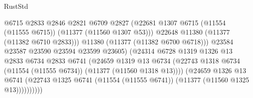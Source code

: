 \begin{lexlean}{RustStd}
\begin{coremodule}
                                              @6715
                                              @2833
                                              @2846
                                              @2821
                                              @6709
                                              @2827
                                              (@22681
                                                @1307
                                                @6715
                                                (@11554 (@11555 @6715))
                                                (@11377 (@11560 @1307 @53)))
                                              @22648
                                              @11380
                                              (@11377 (@11382 @6710 @2833)))
                                            @11380
                                            (@11377 (@11382 @6700 @6718)))
                                          @23584
                                          @23587
                                          @23590
                                          @23594
                                          @23599
                                          @23605)
                                        (@24314
                                          @6728
                                          @1319
                                          @1326
                                          @13
                                          @2833
                                          @6734
                                          @2833
                                          @6741
                                          (@24659
                                            @1319
                                            @13
                                            @6734
                                            (@22743
                                              @1318
                                              @6734
                                              (@11554 (@11555 @6734))
                                              (@11377 (@11560 @1318 @13))))
                                          (@24659
                                            @1326
                                            @13
                                            @6741
                                            (@22743
                                              @1325
                                              @6741
                                              (@11554 (@11555 @6741))
                                              (@11377 (@11560 @1325 @13))))))))))

\end{coremodule}
\end{lexlean}
